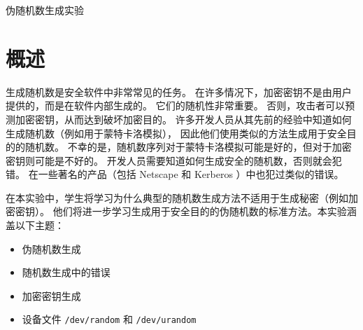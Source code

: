 
\newcommand{\commonfolder}{../../common-files}










\begin{center}
{\LARGE 伪随机数生成实验}
\end{center}




\section{概述}

生成随机数是安全软件中非常常见的任务。
在许多情况下，加密密钥不是由用户提供的，而是在软件内部生成的。
它们的随机性非常重要。
否则，攻击者可以预测加密密钥，从而达到破坏加密目的。
许多开发人员从其先前的经验中知道如何生成随机数（例如用于蒙特卡洛模拟），
因此他们使用类似的方法生成用于安全目的的随机数。
不幸的是，随机数序列对于蒙特卡洛模拟可能是好的，但对于加密密钥则可能是不好的。
开发人员需要知道如何生成安全的随机数，否则就会犯错。
在一些著名的产品（包括 Netscape 和 Kerberos ）中也犯过类似的错误。

在本实验中，学生将学习为什么典型的随机数生成方法不适用于生成秘密（例如加密密钥）。
他们将进一步学习生成用于安全目的的伪随机数的标准方法。本实验涵盖以下主题：

\begin{itemize}[noitemsep]
\item 伪随机数生成
\item 随机数生成中的错误
\item 加密密钥生成
\item 设备文件 \texttt{/dev/random} 和 \texttt{/dev/urandom}
\end{itemize}


